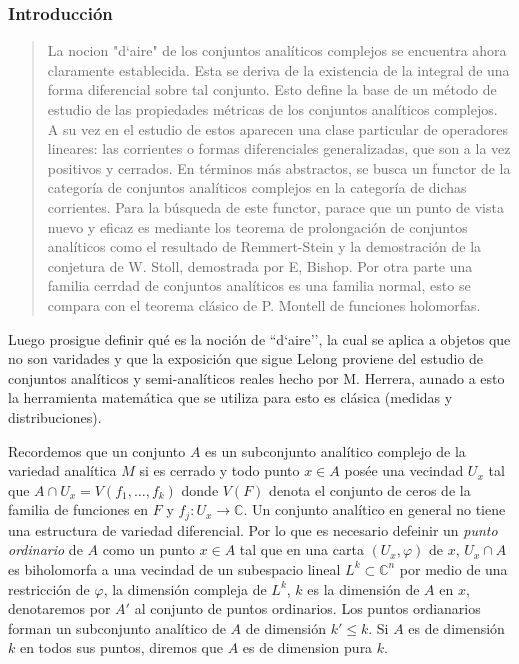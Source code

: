 \documentclass[letterpaper]{article}
\newcommand{\co}{\ensuremath{\mathbb C }}
\newcommand{\con}{\ensuremath{\mathbb{C}^n}}
\begin{document}
\subsubsection{Introducción}
\label{sec:org2efdab1}
\begin{quote}
La nocion "d`aire" de los conjuntos analíticos complejos se encuentra ahora claramente establecida. Esta se deriva de la existencia de la integral de una forma diferencial sobre tal conjunto. Esto define la base de un método de estudio de las propiedades métricas de los conjuntos analíticos complejos. A su vez en el estudio de estos aparecen una clase particular de operadores lineares: las corrientes o formas diferenciales generalizadas, que son a la vez positivos y cerrados. En términos más abstractos, se busca un functor de la categoría de conjuntos analíticos complejos en la categoría de dichas corrientes. Para la búsqueda de este functor, parace que un punto de vista nuevo y eficaz es mediante los teorema de prolongación de conjuntos analíticos como el resultado de Remmert-Stein y la demostración de la conjetura de W. Stoll, demostrada por E, Bishop. Por otra parte una familia cerrdad de conjuntos analíticos es una familia normal, esto se compara con el teorema clásico de P. Montell de funciones holomorfas.
\end{quote}

\noindent Luego prosigue definir qué es la noción de ``d`aire'', la cual se aplica a objetos que no son varidades y que la exposición que sigue Lelong proviene del estudio de conjuntos analíticos y semi-analíticos reales hecho por M. Herrera, aunado a esto la herramienta matemática que se utiliza para esto es clásica (medidas y distribuciones).

Recordemos que un conjunto \(A\) es un subconjunto analítico complejo de la variedad analítica \(M\) si es cerrado y todo punto \(x\in A\) posée una vecindad \(U_x\) tal que \(A\cap U_x=V(f_1,\dots,f_k)\) donde \(V(F)\) denota el conjunto de ceros de la familia de funciones en \(F\) y \(f_j:U_x\rightarrow\co\). Un conjunto analítico en general no tiene una estructura de variedad diferencial. Por lo que es necesario defeinir un \emph{punto ordinario} de \(A\) como un punto \(x\in A\) tal que en una carta \((U_x,\varphi)\) de \(x\), \(U_x\cap A\) es biholomorfa a una vecindad de un subespacio lineal \(L^{k}\subset\con\) por medio de una restricción de \(\varphi\), la dimensión compleja de \(L^{k}\), \(k\) es la dimensión de \(A\) en \(x\), denotaremos por \(A'\) al conjunto de puntos ordinarios. Los puntos ordianarios forman un subconjunto analítico de \(A\) de dimensión \(k'\leq k\). Si \(A\) es de dimensión \(k\) en todos sus puntos, diremos que \(A\) es de dimension pura \(k\).
\end{document}
